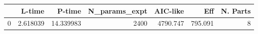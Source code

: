 \begin{tabular}{lrrrrrr}
\toprule
{} &    L-time &     P-time &  N\_params\_expt &  AIC-like &      Eff &  N. Parts \\
\midrule
0 &  2.618039 &  14.339983 &           2400 &  4790.747 &  795.091 &         8 \\
\bottomrule
\end{tabular}
